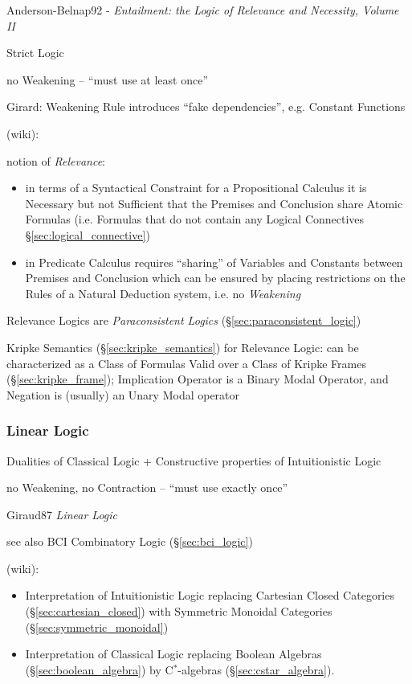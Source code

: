 Anderson-Belnap92 - \emph{Entailment: the Logic of Relevance and
  Necessity, Volume II}

Strict Logic

no Weakening -- ``must use at least once''

Girard: Weakening Rule introduces ``fake dependencies'', e.g. Constant
Functions

(wiki):

notion of \emph{Relevance}:
\begin{itemize}
  \item in terms of a Syntactical Constraint for a
    Propositional Calculus it is Necessary but not Sufficient that the
    Premises and Conclusion share Atomic Formulas (i.e. Formulas that do
    not contain any Logical Connectives \S\ref{sec:logical_connective})
  \item in Predicate Calculus requires ``sharing'' of Variables and
    Constants between Premises and Conclusion which can be ensured by
    placing restrictions on the Rules of a Natural Deduction system,
    i.e. no \emph{Weakening}
\end{itemize}

Relevance Logics are \emph{Paraconsistent Logics}
(\S\ref{sec:paraconsistent_logic})

Kripke Semantics (\S\ref{sec:kripke_semantics}) for Relevance Logic:
can be characterized as a Class of Formulas Valid over a Class of
Kripke Frames (\S\ref{sec:kripke_frame}); Implication Operator is a
Binary Modal Operator, and Negation is (usually) an Unary Modal
operator



\subsubsection{Linear Logic}\label{sec:linear_logic}

Dualities of Classical Logic + Constructive properties of
Intuitionistic Logic

no Weakening, no Contraction -- ``must use exactly once''

Giraud87 \emph{Linear Logic}

\fist see also BCI Combinatory Logic (\S\ref{sec:bci_logic})

(wiki):

\begin{itemize}
\item Interpretation of Intuitionistic Logic replacing Cartesian Closed
  Categories (\S\ref{sec:cartesian_closed}) with Symmetric Monoidal
  Categories (\S\ref{sec:symmetric_monoidal})
\item Interpretation of Classical Logic replacing Boolean Algebras
  (\S\ref{sec:boolean_algebra}) by C$^*$-algebras
  (\S\ref{sec:cstar_algebra}).
\end{itemize}


